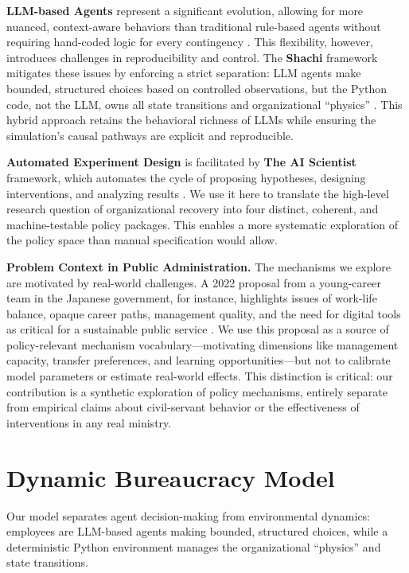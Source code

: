 \documentclass{article}
\begin{document}
\textbf{LLM-based Agents} represent a significant evolution, allowing for more nuanced, context-aware behaviors than traditional rule-based agents without requiring hand-coded logic for every contingency \citep{Park2023GenerativeAI}. This flexibility, however, introduces challenges in reproducibility and control. The \textbf{Shachi} framework mitigates these issues by enforcing a strict separation: LLM agents make bounded, structured choices based on controlled observations, but the Python code, not the LLM, owns all state transitions and organizational ``physics'' \citep{kuroki2025shachi}. This hybrid approach retains the behavioral richness of LLMs while ensuring the simulation's causal pathways are explicit and reproducible.

\textbf{Automated Experiment Design} is facilitated by \textbf{The AI Scientist} framework, which automates the cycle of proposing hypotheses, designing interventions, and analyzing results \citep{lu2024aiscientist}. We use it here to translate the high-level research question of organizational recovery into four distinct, coherent, and machine-testable policy packages. This enables a more systematic exploration of the policy space than manual specification would allow.

\textbf{Problem Context in Public Administration.} The mechanisms we explore are motivated by real-world challenges. A 2022 proposal from a young-career team in the Japanese government, for instance, highlights issues of work-life balance, opaque career paths, management quality, and the need for digital tools as critical for a sustainable public service \citep{wakate2022}. We use this proposal as a source of policy-relevant mechanism vocabulary---motivating dimensions like management capacity, transfer preferences, and learning opportunities---but not to calibrate model parameters or estimate real-world effects. This distinction is critical: our contribution is a synthetic exploration of policy mechanisms, entirely separate from empirical claims about civil-servant behavior or the effectiveness of interventions in any real ministry.

\section{Dynamic Bureaucracy Model}
Our model separates agent decision-making from environmental dynamics: employees are LLM-based agents making bounded, structured choices, while a deterministic Python environment manages the organizational ``physics'' and state transitions.
\end{document}
